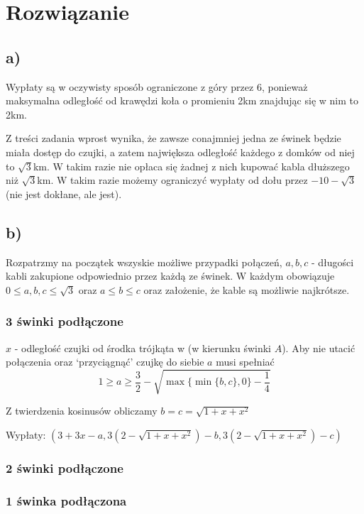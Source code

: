 \documentclass{article}
\begin{document}
\section{Rozwiązanie}

\subsection*{a)}

Wypłaty są w oczywisty sposób ograniczone z góry przez 6, ponieważ maksymalna odległość od krawędzi koła o promieniu 2km znajdując się w nim to 2km.

Z treści zadania wprost wynika, że zawsze conajmniej jedna ze świnek będzie miała dostęp do czujki, a zatem największa odległość każdego z domków od niej to $\sqrt{3}$km. W takim razie nie opłaca się żadnej z nich kupować kabla dłuższego niż $\sqrt{3}$km. W takim razie możemy ograniczyć wypłaty od dołu przez $-10-\sqrt{3}$ (nie jest dokłane, ale jest).

\subsection*{b)}

Rozpatrzmy na początek wszyskie możliwe przypadki połączeń, $a,b,c$ - długości kabli zakupione odpowiednio przez każdą ze świnek. W każdym obowiązuje $0 \leq a,b,c \leq \sqrt{3}$ oraz $a \leq b \leq c$ oraz założenie, że kable są możliwie najkrótsze.

\subsubsection{3 świnki podłączone}

$x$ - odległość czujki od środka trójkąta w (w kierunku świnki $A$). Aby nie utacić połączenia oraz `przyciągnąć' czujkę do siebie $a$ musi spełniać
\[1 \geq a \geq \frac{3}{2} - \sqrt{\max\{\min\{b,c\},0\} - \frac{1}{4}}\]

Z twierdzenia kosinusów obliczamy $b = c = \sqrt{1+ x + x^2}$

Wypłaty: $(3 + 3x - a, 3(2 - \sqrt{1+ x + x^2}) - b, 3(2 - \sqrt{1+ x + x^2}) - c)$


\subsubsection{2 świnki podłączone}

\subsubsection{1 świnka podłączona}
\end{document}
